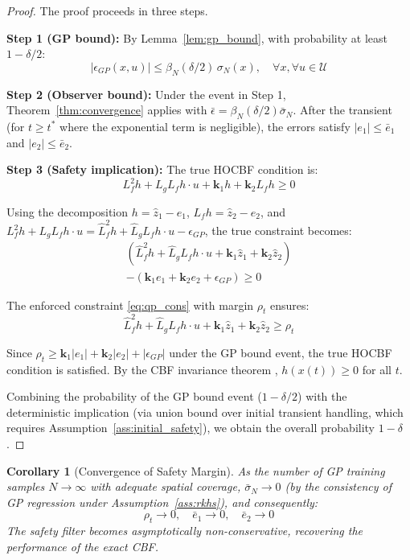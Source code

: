 \documentclass[letterpaper, 10 pt, conference]{ieeeconf}
\newtheorem{corollary}[theorem]{Corollary}
\begin{document}
\begin{proof}
The proof proceeds in three steps.

\textbf{Step 1 (GP bound):} By Lemma~\ref{lem:gp_bound}, with probability at least $1 - \delta/2$:
\begin{equation}
    |\epsilon_{GP}(x, u)| \leq \beta_N(\delta/2) \, \sigma_N(x), \quad \forall x, \forall u \in \mathcal{U}
\end{equation}

\textbf{Step 2 (Observer bound):} Under the event in Step 1, Theorem~\ref{thm:convergence} applies with $\bar{\epsilon} = \beta_N(\delta/2) \bar{\sigma}_N$. After the transient (for $t \geq t^*$ where the exponential term is negligible), the errors satisfy $|e_1| \leq \bar{e}_1$ and $|e_2| \leq \bar{e}_2$.

\textbf{Step 3 (Safety implication):} The true HOCBF condition is:
\begin{equation}
    L_f^2 h + L_g L_f h \cdot u + \bm{k}_1 h + \bm{k}_2 L_f h \geq 0
\end{equation}

Using the decomposition $h = \hat{z}_1 - e_1$, $L_f h = \hat{z}_2 - e_2$, and $L_f^2 h + L_g L_f h \cdot u = \hat{L}_f^2 h + \hat{L}_g L_f h \cdot u - \epsilon_{GP}$, the true constraint becomes:
\begin{multline}
    (\hat{L}_f^2 h + \hat{L}_g L_f h \cdot u + \bm{k}_1 \hat{z}_1 + \bm{k}_2 \hat{z}_2) \\
    - (\bm{k}_1 e_1 + \bm{k}_2 e_2 + \epsilon_{GP}) \geq 0
\end{multline}

The enforced constraint \eqref{eq:qp_cons} with margin $\rho_t$ ensures:
\begin{equation}
    \hat{L}_f^2 h + \hat{L}_g L_f h \cdot u + \bm{k}_1 \hat{z}_1 + \bm{k}_2 \hat{z}_2 \geq \rho_t
\end{equation}

Since $\rho_t \geq \bm{k}_1 |e_1| + \bm{k}_2 |e_2| + |\epsilon_{GP}|$ under the GP bound event, the true HOCBF condition is satisfied. By the CBF invariance theorem \cite{ames2017cbf}, $h(x(t)) \geq 0$ for all $t$.

Combining the probability of the GP bound event ($1 - \delta/2$) with the deterministic implication (via union bound over initial transient handling, which requires Assumption~\ref{ass:initial_safety}), we obtain the overall probability $1 - \delta$.
\end{proof}

\begin{corollary}[Convergence of Safety Margin]
As the number of GP training samples $N \to \infty$ with adequate spatial coverage, $\bar{\sigma}_N \to 0$ (by the consistency of GP regression under Assumption~\ref{ass:rkhs}), and consequently:
\begin{equation}
    \rho_t \to 0, \quad \bar{e}_1 \to 0, \quad \bar{e}_2 \to 0
\end{equation}
The safety filter becomes asymptotically non-conservative, recovering the performance of the exact CBF.
\end{corollary}
\end{document}
